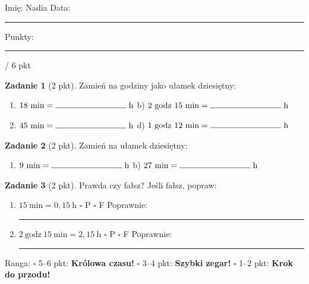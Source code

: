 \documentclass[11pt,a4paper]{article}
\begin{document}

\vspace{0.2em}
Imię: Nadia \hfill Data: \rule{3cm}{0.4pt} \hfill Punkty: \rule{1.2cm}{0.4pt} / 6 pkt

\vspace{0.6em}
\textbf{Zadanie 1} (2 pkt). Zamień na godziny jako ułamek dziesiętny:
\begin{enumerate}[label=\alph*), leftmargin=*, itemsep=6pt]
  \item $18\ \text{min}=\rule{3cm}{0.4pt}\ \text{h}$ \hspace{1cm} b) $2\ \text{godz}\ 15\ \text{min}=\rule{3cm}{0.4pt}\ \text{h}$
  \item $45\ \text{min}=\rule{3cm}{0.4pt}\ \text{h}$ \hspace{1cm} d) $1\ \text{godz}\ 12\ \text{min}=\rule{3cm}{0.4pt}\ \text{h}$
\end{enumerate}

\textbf{Zadanie 2} (2 pkt). Zamień na ułamek dziesiętny:
\begin{enumerate}[label=\alph*), leftmargin=*, itemsep=6pt]
  \item $9\ \text{min}=\rule{3cm}{0.4pt}\ \text{h}$ \hspace{1cm} b) $27\ \text{min}=\rule{3cm}{0.4pt}\ \text{h}$
\end{enumerate}

\textbf{Zadanie 3} (2 pkt). Prawda czy fałsz? Jeśli fałsz, popraw:
\begin{enumerate}[label=\alph*), leftmargin=*, itemsep=6pt]
  \item $15\ \text{min}=0{,}15\ \text{h}$ \quad $\square$ P \quad $\square$ F \quad Poprawnie: \rule{3cm}{0.4pt}
  \item $2\ \text{godz}\ 15\ \text{min}=2{,}15\ \text{h}$ \quad $\square$ P \quad $\square$ F \quad Poprawnie: \rule{3cm}{0.4pt}
\end{enumerate}

\vspace{0.6em}
\begin{tcolorbox}[colback=white, colframe=cel, boxrule=0.6pt, arc=2pt]
Ranga: \quad $\square$ 5--6 pkt: \textbf{Królowa czasu!} \quad $\square$ 3--4 pkt: \textbf{Szybki zegar!} \quad $\square$ 1--2 pkt: \textbf{Krok do przodu!}
\end{tcolorbox}
\end{document}

